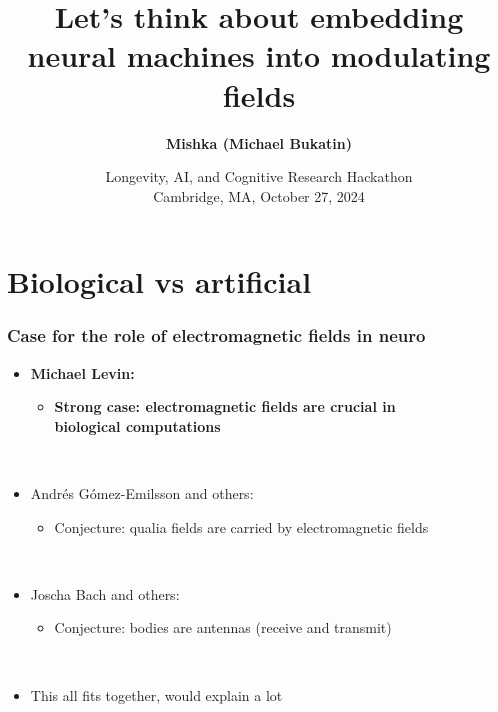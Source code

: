 \documentclass{beamer}
\newcommand{\msmagenta}[1]{{\color{mymagenta} #1}}
\begin{document}
\title{Let's think about embedding neural machines into modulating fields}
\author{\msmagenta{\bf Mishka (Michael Bukatin)}}
\date[]  
{
Longevity, AI, and Cognitive Research Hackathon\\
Cambridge, MA, October 27, 2024}

\begin{frame}
  \titlepage
\end{frame}

\section{Biological vs artificial}


\begin{frame}

  \frametitle{Case for the role of electromagnetic fields in neuro}

\begin{itemize}

\item {\bf Michael Levin:}

\begin{itemize}

\item {\bf Strong case: electromagnetic fields are crucial in\\ biological computations}

\end{itemize}

\ \\

\item Andrés Gómez-Emilsson and others: 

\begin{itemize}

\item Conjecture: qualia fields are carried by electromagnetic fields

\end{itemize}

\ \\

\item  Joscha Bach and others:

\begin{itemize}

\item Conjecture: bodies are antennas (receive and transmit)

\end{itemize}

\ \\

\item  This all fits together, would explain a lot

\end{itemize}

\end{frame}
\end{document}
